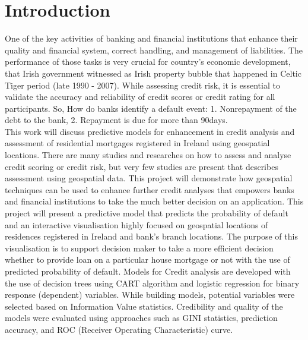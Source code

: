 %
%
%
%

\chapter{Introduction}\label{C.intro}
One of the key activities of banking and financial institutions that enhance their quality and financial system, correct handling, and management of liabilities. The performance of those tasks is very crucial for country's economic development, that Irish government witnessed as Irish property bubble that happened in Celtic Tiger period (late 1990 - 2007). While assessing credit risk, it is essential to validate the accuracy and reliability of credit scores or credit rating for all participants. So, How do banks identify a default event: 1. Nonrepayment of the debt to the bank, 2. Repayment is due for more than 90days.\\

This work will discuss predictive models for enhancement in credit analysis and assessment of residential mortgages registered in Ireland using geospatial locations. There are many studies and researches on how to assess and analyse credit scoring or credit risk, but very few studies are present that describes assessment using geospatial data. This project will demonstrate how geospatial techniques can be used to enhance further credit analyses that empowers banks and financial institutions to take the much better decision on an application. This project will present a predictive model that predicts the probability of default and an interactive visualisation highly focused on geospatial locations of residences registered in Ireland and bank's branch locations. The purpose of this visualisation is to support decision maker to take a more efficient decision whether to provide loan on a particular house mortgage or not with the use of predicted probability of default. Models for Credit analysis are developed with the use of decision trees using CART algorithm and logistic regression for binary response (dependent) variables. While building models, potential variables were selected based on Information Value statistics. Credibility and quality of the models were evaluated using approaches such as GINI statistics, prediction accuracy, and ROC (Receiver Operating Characteristic) curve.\\

